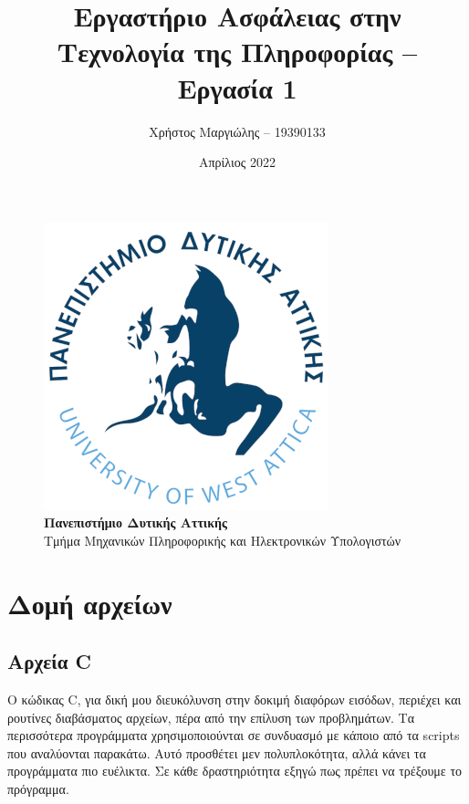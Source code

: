 \documentclass[12pt]{article}
\title{Εργαστήριο Ασφάλειας στην Τεχνολογία της Πληροφορίας -- Εργασία 1}
\author{Χρήστος Μαργιώλης -- 19390133}
\date{Απρίλιος 2022}
\begin{document}
\begin{titlepage}
        \maketitle
        \begin{figure}[t!]
        \begin{center}
        \includegraphics[scale=0.3]{./res/uniwalogo.png} \\
        \Large
        \textbf{Πανεπιστήμιο Δυτικής Αττικής} \\
        \large
        Τμήμα Μηχανικών Πληροφορικής και Ηλεκτρονικών Υπολογιστών
        \end{center}
        \end{figure}
\end{titlepage}

\renewcommand{\contentsname}{Περιεχόμενα}
\tableofcontents
\pagebreak

\section{Δομή αρχείων}

\subsection{Αρχεία C}

Ο κώδικας C, για δική μου διευκόλυνση στην δοκιμή διαφόρων εισόδων, περιέχει και
ρουτίνες διαβάσματος αρχείων, πέρα από την επίλυση των προβλημάτων. Τα περισσότερα
προγράμματα χρησιμοποιούνται σε συνδυασμό με κάποιο από τα scripts που αναλύονται
παρακάτω. Αυτό προσθέτει μεν πολυπλοκότητα, αλλά κάνει τα προγράμματα πιο ευέλικτα.
Σε κάθε δραστηριότητα εξηγώ πως πρέπει να τρέξουμε το πρόγραμμα.
\end{document}
